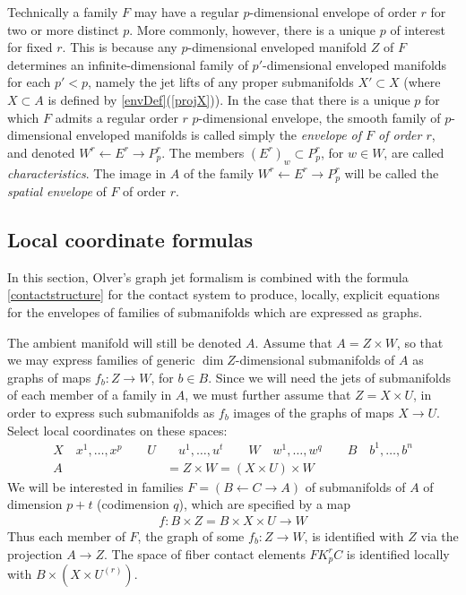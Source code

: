 \documentclass[12pt]{article}
\numberwithin{equation}{section}
\theoremstyle{plain}
\theoremstyle{definition}
\newcommand{\la}{\leftarrow}
\newcommand{\ra}{\rightarrow}
\begin{document}
Technically a family $F$ may have a regular $p$-dimensional envelope of order $r$ for two or more distinct $p$. More commonly, however, there is a unique $p$ of interest for fixed $r$. This is because any $p$-dimensional enveloped manifold $Z$ of $F$ determines an infinite-dimensional family of $p'$-dimensional enveloped manifolds for each  $p'<p$, namely the jet lifts of any proper submanifolds $X'\subset X$ (where $X\subset A$ is defined by \ref{envDef}(\ref{projX})). In the case that there is a unique $p$ for which $F$ admits a regular order $r$ $p$-dimensional envelope, the smooth family of $p$-dimensional enveloped manifolds is called simply the \emph{envelope of $F$ of order $r$}, and denoted $W^{r}\la E^{r} \ra P^{r}_{p}$. The members $(E^{r})_{w}\subset P^{r}_{p}$, for $w\in W$, are called \emph{characteristics}. The image in $A$ of the family $W^{r}\la E^{r} \ra P^{r}_{p}$ will be called the \emph{spatial envelope} of $F$ of order $r$.
\subsection{Local coordinate formulas}
In this section, Olver's graph jet formalism is combined with the formula \ref{contactstructure} for the contact system to produce, locally, explicit equations for the envelopes of families of submanifolds which are expressed as graphs.

The ambient manifold will still be denoted $A$. Assume that $A=Z\times W$, so that we may express families of generic $\dim Z$-dimensional submanifolds of $A$ as graphs of maps $f_{b}:Z\ra W$, for $b\in B$. Since we will need the jets of submanifolds of each member of a family in $A$, we must further assume that $Z=X\times U$, in order to express such submanifolds as $f_{b}$ images of the graphs of maps $X\ra U$. Select local coordinates on these spaces:
\begin{align*}
X\quad x^{1},\dots,x^{p}\qquad U&\quad u^{1},\dots,u^{t} \qquad W\quad w^{1},\dots,w^{q} \qquad B\quad b^{1},\dots,b^{n}\\
A&=Z\times W=(X\times U)\times W
\end{align*}
We will be interested in families $F=(B\la C\ra A)$ of submanifolds of $A$ of dimension $p+t$ (codimension $q$), which are specified by a map
\begin{align*}
f:B\times Z=B\times X\times U\ra W
\end{align*}
Thus each member of $F$, the graph of some $f_b:Z\ra W$, is identified with $Z$ via the projection $A\ra Z$. The space of fiber contact elements $FK^{r}_{p}C$ is identified locally with $B\times (X\times U^{(r)})$.
\end{document}
